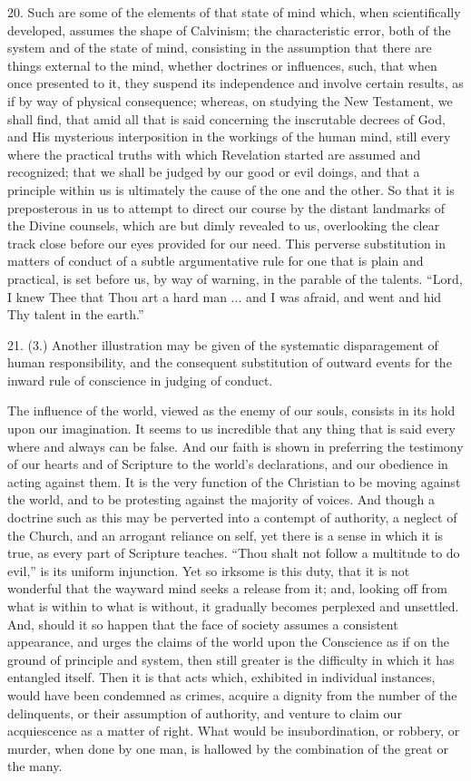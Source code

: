 20. Such are some of the elements of that state of mind which, when
scientifically developed, assumes the shape of Calvinism; the
characteristic error, both of the system and of the state of mind,
consisting in the assumption that there are things external to the
mind, whether doctrines or influences, such, that when once presented
to it, they suspend its independence and involve certain results, as
if by way of physical consequence; whereas, on studying the New
Testament, we shall find, that amid all that is said concerning the
inscrutable decrees of God, and His mysterious interposition in the
workings of the human mind, still every where the practical truths
with which Revelation started are assumed and recognized; that we
shall be judged by our good or evil doings, and that a principle
within us is ultimately the cause of the one and the other. So that it
is preposterous in us to attempt to direct our course by the distant
landmarks of the Divine counsels, which are but dimly revealed to us,
overlooking the clear track close before our eyes provided for our
need. This perverse substitution in matters of conduct of a subtle
argumentative rule for one that is plain and practical, is set before
us, by way of warning, in the parable of the talents. ``Lord, I
knew Thee that Thou art a hard man ... and I was afraid, and went and
hid Thy talent in the earth.''

21. (3.) Another illustration may be given of the systematic
disparagement of human responsibility, and the consequent substitution
of outward events for the inward rule of conscience in judging of
conduct.

The influence of the world, viewed as the enemy of our souls,
consists in its hold upon our imagination. It seems to us incredible
that any thing that is said every where and always can be false. And
our faith is shown in preferring the testimony of our hearts and of
Scripture to the world's declarations, and our obedience in acting
against them. It is the very function of the Christian to be moving
against the world, and to be protesting against the majority of
voices. And though a doctrine such as this may be perverted into a
contempt of authority, a neglect of the Church, and an arrogant
reliance on self, yet there is a sense in which it is true, as every
part of Scripture teaches. ``Thou shalt not follow a multitude to
do evil,'' is its uniform injunction. Yet so irksome is this duty,
that it is not wonderful that the wayward mind seeks a release from
it; and, looking off from what is within to what is without, it
gradually becomes perplexed and unsettled. And, should it so happen
that the face of society assumes a consistent appearance, and urges
the claims of the world upon the Conscience as if on the ground of
principle and system, then still greater is the difficulty in which it
has entangled itself. Then it is that acts which, exhibited in
individual instances, would have been condemned as crimes, acquire a
dignity from the number of the delinquents, or their assumption of
authority, and venture to claim our acquiescence as a matter of right.
What would be insubordination, or robbery, or murder, when done by one
man, is hallowed by the combination of the great or the many.

